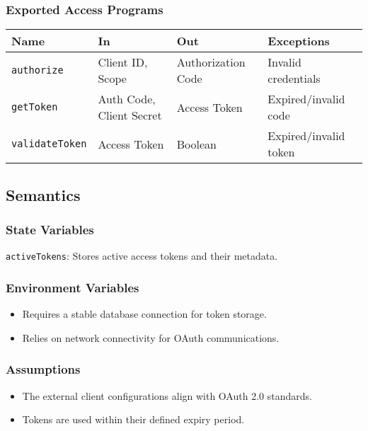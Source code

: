 \documentclass[12pt, titlepage]{article}
\begin{document}
\subsubsection{Exported Access Programs}

\begin{center}
\begin{tabular}{p{3cm} p{4cm} p{4cm} p{3.5cm}}
\hline
\textbf{Name} & \textbf{In} & \textbf{Out} & \textbf{Exceptions} \\
\hline
\texttt{authorize} & Client ID, Scope & Authorization Code & Invalid credentials \\
\texttt{getToken} & Auth Code, Client Secret & Access Token & Expired/invalid code \\
\texttt{validateToken} & Access Token & Boolean & Expired/invalid token \\
\hline
\end{tabular}
\end{center}

\subsection{Semantics}

\subsubsection{State Variables}

\texttt{activeTokens}: Stores active access tokens and their metadata.

\subsubsection{Environment Variables}

\begin{itemize}
    \item Requires a stable database connection for token storage.
    \item Relies on network connectivity for OAuth communications.
\end{itemize}

\subsubsection{Assumptions}

\begin{itemize}
    \item The external client configurations align with OAuth 2.0 standards.
    \item Tokens are used within their defined expiry period.
\end{itemize}
\end{document}
